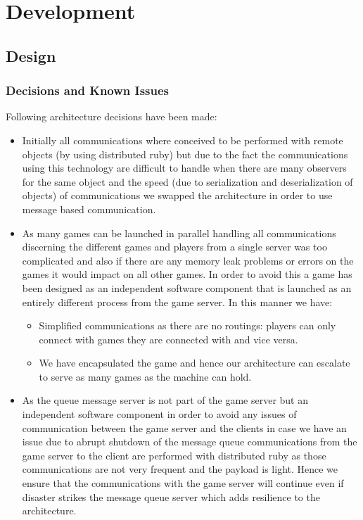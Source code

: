 \documentclass[a4paper,10pt,titlepage]{article}
\begin{document}
\section{Development}

\subsection{Design}

\subsubsection{Decisions and Known Issues}

\par Following architecture decisions have been made:
\begin{itemize}
	\item Initially all communications where conceived to be performed with remote objects (by using distributed ruby) but due to the fact the communications using this technology are difficult to handle when there are many observers for the same object and the speed (due to serialization and deserialization of objects) of communications we swapped the architecture in order to use message based communication.
	\item As many games can be launched in parallel handling all communications discerning the different games and players from a single server was too complicated and also if there are any memory leak problems or errors on the games it would impact on all other games. In order to avoid this a game has been designed as an independent software component that is launched as an entirely different process from the game server. In this manner we have:
	\begin{itemize}
		\item Simplified communications as there are no routings: players can only connect with games they are connected with and vice versa.
		\item We have encapsulated the game and hence our architecture can escalate to serve as many games as the machine can hold.
	\end{itemize}
	\item As the queue message server is not part of the game server but an independent software component in order to avoid any issues of communication between the game server and the clients in case we have an issue due to abrupt shutdown of the message queue communications from the game server to the client are performed with distributed ruby as those communications are not very frequent and the payload is light. Hence we ensure that the communications with the game server will continue even if disaster strikes the message queue server which adds resilience to the architecture.

\end{itemize}
\end{document}
